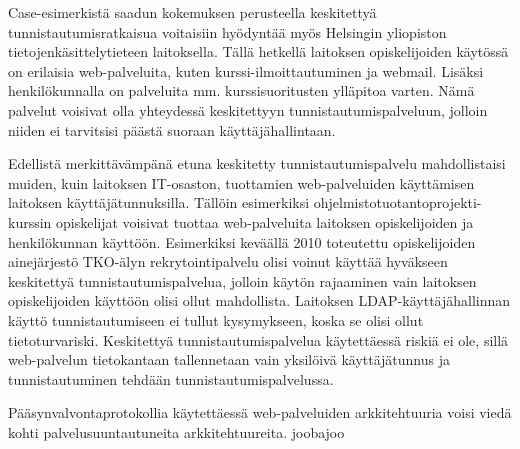 Case-esimerkistä saadun kokemuksen perusteella keskitettyä tunnistautumisratkaisua voitaisiin hyödyntää myös Helsingin yliopiston tietojenkäsittelytieteen laitoksella. Tällä hetkellä laitoksen opiskelijoiden käytössä on erilaisia web-palveluita, kuten kurssi-ilmoittautuminen ja webmail. Lisäksi henkilökunnalla on palveluita mm. kurssisuoritusten ylläpitoa varten. Nämä palvelut voisivat olla yhteydessä keskitettyyn tunnistautumispalveluun, jolloin niiden ei tarvitsisi päästä suoraan käyttäjähallintaan.

Edellistä merkittävämpänä etuna keskitetty tunnistautumispalvelu mahdollistaisi muiden, kuin laitoksen IT-osaston, tuottamien web-palveluiden käyttämisen laitoksen käyttäjätunnuksilla. Tällöin esimerkiksi ohjelmistotuotantoprojekti-kurssin opiskelijat voisivat tuottaa web-palveluita laitoksen opiskelijoiden ja henkilökunnan käyttöön. Esimerkiksi keväällä 2010 toteutettu opiskelijoiden ainejärjestö TKO-älyn rekrytointipalvelu olisi voinut käyttää hyväkseen keskitettyä tunnistautumispalvelua, jolloin käytön rajaaminen vain laitoksen opiskelijoiden käyttöön olisi ollut mahdollista. Laitoksen LDAP-käyttäjähallinnan käyttö tunnistautumiseen ei tullut kysymykseen, koska se olisi ollut tietoturvariski. Keskitettyä tunnistautumispalvelua käytettäessä riskiä ei ole, sillä web-palvelun tietokantaan tallennetaan vain yksilöivä käyttäjätunnus ja tunnistautuminen tehdään tunnistautumispalvelussa.

Pääsynvalvontaprotokollia käytettäessä web-palveluiden arkkitehtuuria voisi viedä kohti palvelusuuntautuneita arkkitehtuureita. joobajoo